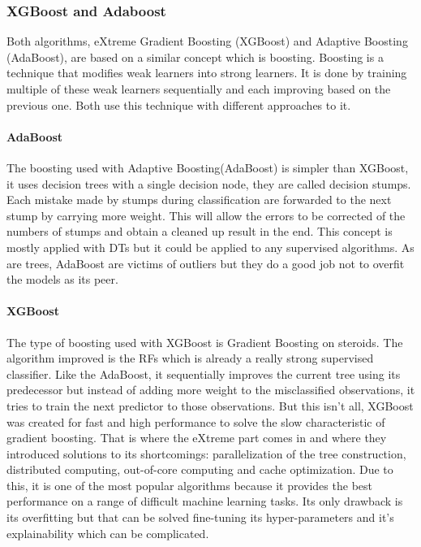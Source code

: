 \subsubsection{XGBoost and Adaboost}
Both algorithms, eXtreme Gradient Boosting (XGBoost) and Adaptive Boosting (AdaBoost), are based on a similar concept which is boosting. Boosting is a technique that modifies weak learners into strong learners. It is done by training multiple of these weak learners sequentially and each improving based on the previous one.\cite{boosting} Both use this technique with different approaches to it.

\paragraph{AdaBoost}
The boosting used with Adaptive Boosting(AdaBoost) is simpler than XGBoost, it uses decision trees with a single decision node, they are called decision stumps. Each mistake made by stumps during classification are forwarded to the next stump by carrying more weight. This will allow the errors to be corrected of the numbers of stumps and obtain a cleaned up result in the end. This concept is mostly applied with DTs but it could be applied to any supervised algorithms. As are trees, AdaBoost are victims of outliers but they do a good job not to overfit the models as its peer. 

\paragraph{XGBoost}
The type of boosting used with XGBoost is Gradient Boosting on steroids. The algorithm improved is the RFs which is already a really strong supervised classifier. Like the AdaBoost, it sequentially improves the current tree using its predecessor but instead of adding more weight to the misclassified observations, it tries to train the next predictor to those observations. But this isn't all, XGBoost was created for fast and high performance to solve the slow characteristic of gradient boosting. That is where the eXtreme part comes in and where they introduced solutions to its shortcomings: parallelization of the tree construction,  distributed computing, out-of-core computing and cache optimization.\cite{xgboost} Due to this, it is one of the most popular algorithms because it provides the best performance on a range of difficult machine learning tasks. Its only drawback is its overfitting but that can be solved fine-tuning its hyper-parameters and it's explainability which can be complicated.

